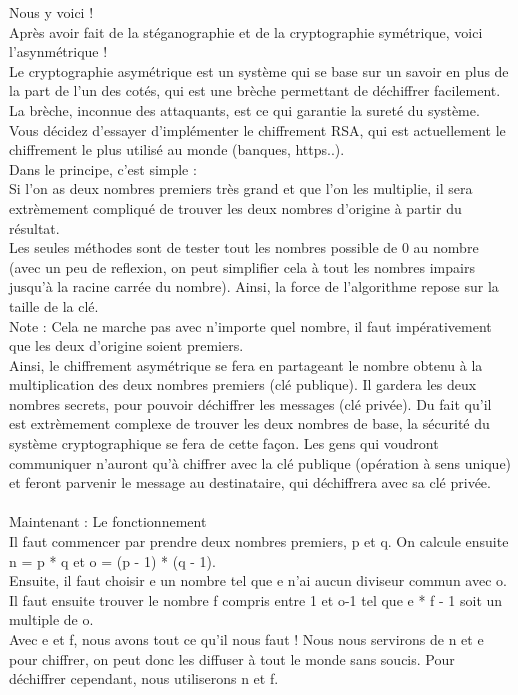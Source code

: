 \documentclass[12pt]{article}
\begin{document}
Nous y voici !\\
Après avoir fait de la stéganographie et de la cryptographie symétrique, voici l'asynmétrique !\\
Le cryptographie asymétrique est un système qui se base sur un savoir en plus de la part de l'un des cotés, qui est une brèche permettant de déchiffrer facilement. La brèche, inconnue des attaquants, est ce qui garantie la sureté du système.\\
Vous décidez d'essayer d'implémenter le chiffrement RSA, qui est actuellement le chiffrement le plus utilisé au monde (banques, https..).\\
Dans le principe, c'est simple :\\
Si l'on as deux nombres premiers très grand et que l'on les multiplie, il sera extrèmement compliqué de trouver les deux nombres d'origine à partir du résultat.\\
Les seules méthodes sont de tester tout les nombres possible de 0 au nombre (avec un peu de reflexion, on peut simplifier cela à tout les nombres impairs jusqu'à la racine carrée du nombre). Ainsi, la force de l'algorithme repose sur la taille de la clé.\\
Note : Cela ne marche pas avec n'importe quel nombre, il faut impérativement que les deux d'origine soient premiers.\\
Ainsi, le chiffrement asymétrique se fera en partageant le nombre obtenu à la multiplication des deux nombres premiers (clé publique). Il gardera les deux nombres secrets, pour pouvoir déchiffrer les messages (clé privée). Du fait qu'il est extrèmement complexe de trouver les deux nombres de base, la sécurité du système cryptographique se fera de cette façon. Les gens qui voudront communiquer n'auront qu'à chiffrer avec la clé publique (opération à sens unique) et feront parvenir le message au destinataire, qui déchiffrera avec sa clé privée.
\\\\
Maintenant : Le fonctionnement\\
Il faut commencer par prendre deux nombres premiers, p et q. On calcule ensuite n = p * q et o = (p - 1) * (q - 1).\\
Ensuite, il faut choisir e un nombre tel que e n'ai aucun diviseur commun avec o.\\
Il faut ensuite trouver le nombre f compris entre 1 et o-1 tel que e * f - 1 soit un multiple de o.\\
Avec e et f, nous avons tout ce qu'il nous faut ! Nous nous servirons de n et e pour chiffrer, on peut donc les diffuser à tout le monde sans soucis. Pour déchiffrer cependant, nous utiliserons n et f.
\end{document}
